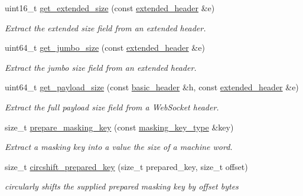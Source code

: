 \begin{DoxyCompactItemize}
uint16\+\_\+t \mbox{\hyperlink{namespacewebsocketpp_1_1frame_a5ae0cc87ac44bb78c5dc41983c43a0c4}{get\+\_\+extended\+\_\+size}} (const \mbox{\hyperlink{structwebsocketpp_1_1frame_1_1extended__header}{extended\+\_\+header}} \&e)
\begin{DoxyCompactList}\small\item\em Extract the extended size field from an extended header. \end{DoxyCompactList}\item 
uint64\+\_\+t \mbox{\hyperlink{namespacewebsocketpp_1_1frame_ac55b672bcd3baf4c5a074816f6eb035b}{get\+\_\+jumbo\+\_\+size}} (const \mbox{\hyperlink{structwebsocketpp_1_1frame_1_1extended__header}{extended\+\_\+header}} \&e)
\begin{DoxyCompactList}\small\item\em Extract the jumbo size field from an extended header. \end{DoxyCompactList}\item 
uint64\+\_\+t \mbox{\hyperlink{namespacewebsocketpp_1_1frame_a2ca0b9ba6077f201997da543d45b067f}{get\+\_\+payload\+\_\+size}} (const \mbox{\hyperlink{structwebsocketpp_1_1frame_1_1basic__header}{basic\+\_\+header}} \&h, const \mbox{\hyperlink{structwebsocketpp_1_1frame_1_1extended__header}{extended\+\_\+header}} \&e)
\begin{DoxyCompactList}\small\item\em Extract the full payload size field from a Web\+Socket header. \end{DoxyCompactList}\item 
size\+\_\+t \mbox{\hyperlink{namespacewebsocketpp_1_1frame_af80eee705eb39fb533cf4ab3d7a6d3bb}{prepare\+\_\+masking\+\_\+key}} (const \mbox{\hyperlink{unionwebsocketpp_1_1frame_1_1uint32__converter}{masking\+\_\+key\+\_\+type}} \&key)
\begin{DoxyCompactList}\small\item\em Extract a masking key into a value the size of a machine word. \end{DoxyCompactList}\item 
size\+\_\+t \mbox{\hyperlink{namespacewebsocketpp_1_1frame_a76bf120d54d47d760eb8bd803572b004}{circshift\+\_\+prepared\+\_\+key}} (size\+\_\+t prepared\+\_\+key, size\+\_\+t offset)
\begin{DoxyCompactList}\small\item\em circularly shifts the supplied prepared masking key by offset bytes \end{DoxyCompactList}\item 

\end{DoxyCompactItemize}
